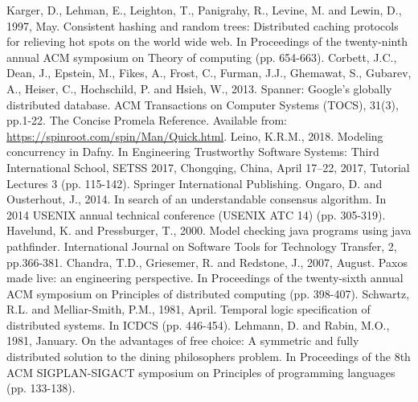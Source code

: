 \begin{thebibliography}{9}
Karger, D., Lehman, E., Leighton, T., Panigrahy, R., Levine, M. and Lewin, D., 1997, May. Consistent hashing and random trees: Distributed caching protocols for relieving hot spots on the world wide web. In Proceedings of the twenty-ninth annual ACM symposium on Theory of computing (pp. 654-663).
Corbett, J.C., Dean, J., Epstein, M., Fikes, A., Frost, C., Furman, J.J., Ghemawat, S., Gubarev, A., Heiser, C., Hochschild, P. and Hsieh, W., 2013. Spanner: Google’s globally distributed database. ACM Transactions on Computer Systems (TOCS), 31(3), pp.1-22.
The Concise Promela Reference.
Available from: \url{https://spinroot.com/spin/Man/Quick.html}.
Leino, K.R.M., 2018. Modeling concurrency in Dafny. In Engineering Trustworthy Software Systems: Third International School, SETSS 2017, Chongqing, China, April 17–22, 2017, Tutorial Lectures 3 (pp. 115-142). Springer International Publishing.
Ongaro, D. and Ousterhout, J., 2014. In search of an understandable consensus algorithm. In 2014 USENIX annual technical conference (USENIX ATC 14) (pp. 305-319).
Havelund, K. and Pressburger, T., 2000. Model checking java programs using java pathfinder. International Journal on Software Tools for Technology Transfer, 2, pp.366-381.
Chandra, T.D., Griesemer, R. and Redstone, J., 2007, August. Paxos made live: an engineering perspective. In Proceedings of the twenty-sixth annual ACM symposium on Principles of distributed computing (pp. 398-407).
Schwartz, R.L. and Melliar-Smith, P.M., 1981, April. Temporal logic specification of distributed systems. In ICDCS (pp. 446-454).
Lehmann, D. and Rabin, M.O., 1981, January. On the advantages of free choice: A symmetric and fully distributed solution to the dining philosophers problem. In Proceedings of the 8th ACM SIGPLAN-SIGACT symposium on Principles of programming languages (pp. 133-138).
\end{thebibliography}
